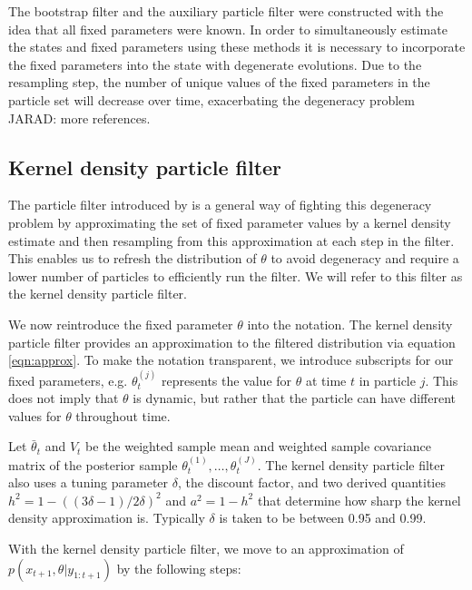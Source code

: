 \documentclass{elsarticle}
\newcommand{\jarad}[1]{{\color{red}JARAD: #1}}
\begin{document}
The bootstrap filter and the auxiliary particle filter were constructed with the idea that all fixed parameters were known. In order to simultaneously estimate the states and fixed parameters using these methods it is necessary to incorporate the fixed parameters into the state with degenerate evolutions. Due to the resampling step, the number of unique values of the fixed parameters in the particle set will decrease over time, exacerbating the degeneracy problem \citep{Liu:West:comb:2001} \jarad{more references}.

\subsection{Kernel density particle filter \label{sec:kd}} 

The particle filter introduced by \cite{Liu:West:comb:2001} is a general way of fighting this degeneracy problem by approximating the set of fixed parameter values by a kernel density estimate and then resampling from this approximation at each step in the filter. This enables us to refresh the distribution of $\theta$ to avoid degeneracy and require a lower number of particles to efficiently run the filter. We will refer to this filter as the kernel density particle filter.

We now reintroduce the fixed parameter $\theta$ into the notation. The kernel density particle filter provides an approximation to the filtered distribution via equation \eqref{eqn:approx}. To make the notation transparent, we introduce subscripts for our fixed parameters, e.g. $\theta_t^{(j)}$ represents the value for $\theta$ at time $t$ in particle $j$. This does not imply that $\theta$ is dynamic, but rather that the particle can have different values for $\theta$ throughout time.

Let $\bar{\theta}_t$ and $V_t$ be the weighted sample mean and weighted sample covariance matrix of the posterior sample $\theta_t^{(1)},\ldots,\theta_t^{(J)}$.  The kernel density particle filter also uses a tuning parameter $\delta$, the discount factor, and two derived quantities $h^2 = 1 - ((3\delta - 1)/2\delta)^2$ and $a^2 = 1 - h^2$ that determine how sharp the kernel density approximation is. Typically $\delta$ is taken to be between 0.95 and 0.99.

With the kernel density particle filter, we move to an approximation of $p(x_{t+1},\theta|y_{1:t+1})$ by the following steps:
\end{document}
